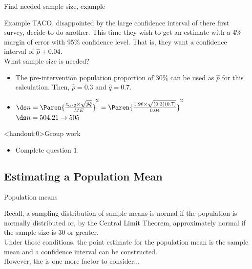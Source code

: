 \documentclass[xcolor=table]{beamer}
\begin{document}
\begin{frame}{Find needed sample size, example}
\begin{exampleblock}{Example}
\large
TACO, disappointed by the large confidence interval of there first survey, decide to do another. This time they wish to get an estimate with a 4\% margin of error with 95\% confidence level. That is, they want a confidence interval of $\hat p \pm 0.04$.\\
\medskip
What sample size is needed?
\begin{itemize}
\pause\item The pre-intervention population proportion of 30\% can be used as $\hat p$ for this calculation. Then, $\hat p = 0.3$ and $\hat q = 0.7$.
\pause\item $\ds n = \Paren{\frac {z_{\alpha/2} \times \sqrt{\hat p \hat q}}{ME}}^2 = \Paren{\frac {1.96 \times \sqrt{(0.3) (0.7)}}{0.04}}^2$\\
\medskip
$\ds n = 504.21 \to 505$ 
\end{itemize}
\end{exampleblock}
\end{frame}

\begin{frame}<handout:0>{Group work}
\begin{block}{}
\large
\begin{itemize}
\item Complete question 1.
\end{itemize}
\end{block}
\end{frame}


\subsection{Estimating a Population Mean}

\begin{frame}{Population means}

\begin{block}{}
\large
Recall, a sampling distribution of sample means is normal if the population is normally distributed or, by the Central Limit Theorem, approximately normal if the sample size is 30 or greater.\\
\pause\medskip
Under those conditions, the point estimate for the population mean is the sample mean and a confidence interval can be constructed.\\
\pause\medskip
However, the is one more factor to consider...
\end{block}
\end{frame}
\end{document}
